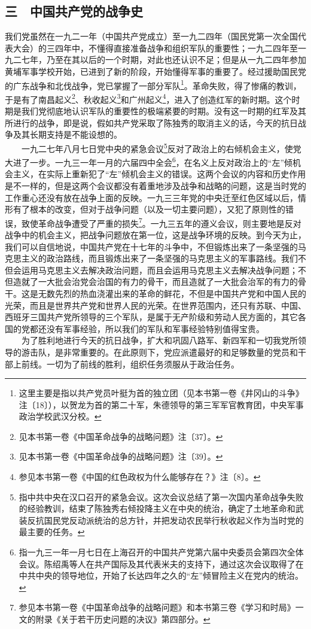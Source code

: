 \documentclass[cn,11pt,chinese]{elegantbook}
\def\myformat#1{\hfil\hfil #1}
\begin{document}
\subsection*{\myformat{三　中国共产党的战争史}}
我们党虽然在一九二一年（中国共产党成立）至一九二四年（国民党第一次全国代表大会）的三四年中，不懂得直接准备战争和组织军队的重要性；一九二四年至一九二七年，乃至在其以后的一个时期，对此也还认识不足；但是从一九二四年参加黄埔军事学校开始，已进到了新的阶段，开始懂得军事的重要了。经过援助国民党的广东战争和北伐战争，党已掌握了一部分军队\footnote[18]{ 这里主要是指以共产党员叶挺为首的独立团（见本书第一卷《井冈山的斗争》注〔18〕），以贺龙为首的第二十军，朱德领导的第三军军官教育团，中央军事政治学校武汉分校。}。革命失败，得了惨痛的教训，于是有了南昌起义\footnote[19]{ 见本书第一卷《中国革命战争的战略问题》注〔37〕。}、秋收起义\footnote[20]{ 见本书第一卷《中国革命战争的战略问题》注〔39〕。}和广州起义\footnote[21]{ 参见本书第一卷《中国的红色政权为什么能够存在？》注〔8〕。}，进入了创造红军的新时期。这个时期是我们党彻底地认识军队的重要性的极端紧要的时期。没有这一时期的红军及其所进行的战争，即是说，假如共产党采取了陈独秀的取消主义的话，今天的抗日战争及其长期支持是不能设想的。\\
　　一九二七年八月七日党中央的紧急会议\footnote[22]{ 指中共中央在汉口召开的紧急会议。这次会议总结了第一次国内革命战争失败的经验教训，结束了陈独秀右倾投降主义在中央的统治，确定了土地革命和武装反抗国民党反动派统治的总方针，并把发动农民举行秋收起义作为当时党的最主要的任务。}反对了政治上的右倾机会主义，使党大进了一步。一九三一年一月的六届四中全会\footnote[23]{ 指一九三一年一月七日在上海召开的中国共产党第六届中央委员会第四次全体会议。陈绍禹等人在共产国际及其代表米夫的支持下，通过这次会议取得了在中共中央的领导地位，开始了长达四年之久的“左”倾冒险主义在党内的统治。}，在名义上反对政治上的“左”倾机会主义，在实际上重新犯了“左”倾机会主义的错误。这两个会议的内容和历史作用是不一样的，但是这两个会议都没有着重地涉及战争和战略的问题，这是当时党的工作重心还没有放在战争上面的反映。一九三三年党的中央迁至红色区域以后，情形有了根本的改变，但对于战争问题（以及一切主要问题），又犯了原则性的错误，致使革命战争遭受了严重的损失\footnote[24]{ 参见本书第一卷《中国革命战争的战略问题》和本书第三卷《学习和时局》一文的附录《关于若干历史问题的决议》第四部分。}。一九三五年的遵义会议，则主要地是反对战争中的机会主义，把战争问题放在第一位，这是战争环境的反映。到今天为止，我们可以自信地说，中国共产党在十七年的斗争中，不但锻炼出来了一条坚强的马克思主义的政治路线，而且锻炼出来了一条坚强的马克思主义的军事路线。我们不但会运用马克思主义去解决政治问题，而且会运用马克思主义去解决战争问题；不但造就了一大批会治党会治国的有力的骨干，而且造就了一大批会治军的有力的骨干。这是无数先烈的热血浇灌出来的革命的鲜花，不但是中国共产党和中国人民的光荣，而且是世界共产党和世界人民的光荣。在世界范围内，还只有苏联、中国、西班牙三国共产党所领导的三个军队，是属于无产阶级和劳动人民方面的，其它各国的党都还没有军事经验，所以我们的军队和军事经验特别值得宝贵。\\
　　为了胜利地进行今天的抗日战争，扩大和巩固八路军、新四军和一切我党所领导的游击队，是非常重要的。在此原则下，党应派遣最好的和足够数量的党员和干部上前线。一切为了前线的胜利，组织任务须服从于政治任务。\\
\end{document}
